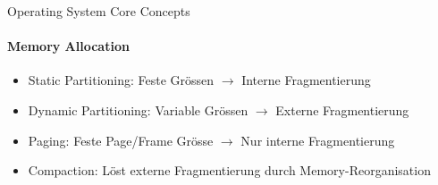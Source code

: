 \begin{KR}{Operating System Core Concepts}
    \paragraph{Memory Allocation}
    \begin{itemize}
        \item Static Partitioning: Feste Grössen $\rightarrow$ Interne Fragmentierung
        \item Dynamic Partitioning: Variable Grössen $\rightarrow$ Externe Fragmentierung
        \item Paging: Feste Page/Frame Grösse $\rightarrow$ Nur interne Fragmentierung
        \item Compaction: Löst externe Fragmentierung durch Memory-Reorganisation
    \end{itemize}
\end{KR}

